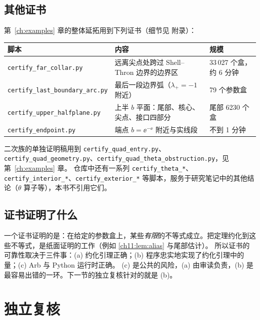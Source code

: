 \subsection{其他证书}
第~\ref{ch:examples} 章的整体延拓用到下列证书（细节见 \cite{KneserPaper} 附录）：
\begin{center}\small
\begin{tabular}{p{}p{}p{}}
\toprule
脚本 & 内容 & 规模\\
\midrule
\texttt{certify\_\allowbreak{}far\_\allowbreak{}collar.py} & 远离尖点处跨过 Shell--Thron 边界的边界区 & 33\,027 个盒，约 6 分钟\\
\texttt{certify\_\allowbreak{}last\_\allowbreak{}boundary\_\allowbreak{}arc.py} & 最后一段边界弧（$\lambda_+=-1$ 附近） & 79 个参数盒\\
\texttt{certify\_\allowbreak{}upper\_\allowbreak{}halfplane.py} & 上半 $b$ 平面：尾部、核心、尖点、接口四部分 & 尾部 6230 个盒\\
\texttt{certify\_\allowbreak{}endpoint.py} & 端点 $b=\ee^{-\ee}$ 附近与实线段 & 不到 1 分钟\\
\bottomrule
\end{tabular}
\end{center}
二次族的单独证明稿用到 \texttt{certify\_\allowbreak{}quad\_\allowbreak{}entry.py}、\texttt{certify\_\allowbreak{}quad\_\allowbreak{}geometry.py}、\texttt{certify\_\allowbreak{}quad\_\allowbreak{}theta\_\allowbreak{}obstruction.py}，见第~\ref{ch:examples} 章。
仓库中还有一系列 \texttt{certify\_\allowbreak{}theta\_\allowbreak{}*}、\texttt{certify\_\allowbreak{}interior\_\allowbreak{}*}、\texttt{certify\_\allowbreak{}exterior\_\allowbreak{}*} 等脚本，服务于研究笔记中的其他结论（$\theta$ 算子等），本书不引用它们。

\subsection{证书证明了什么}
一个证书证明的是：在给定的参数盒上，某些\emph{有限}的不等式成立。把定理约化到这些不等式，是纸面证明的工作（例如 \cref{ch11:lem:alias} 与尾部估计）。
所以证书的可靠性取决于三件事：(a) 约化引理正确；(b) 程序忠实地实现了约化引理中的量；(c) Arb 与 Python 运行时正确。
(c) 是公共的风险，(a) 由审读负责，(b) 是最容易出错的一环。下一节的独立复核针对的就是 (b)。

\section{独立复核}\label{ch11:sec:independent}

